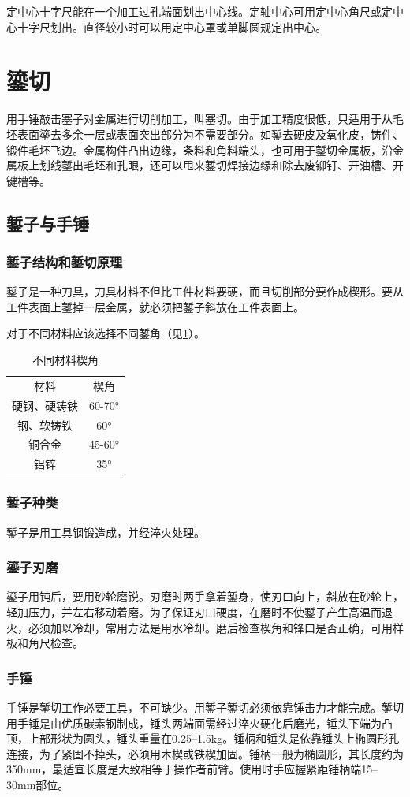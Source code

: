 \documentclass{ctexbook}
\begin{document}
定中心十字尺能在一个加工过孔端面划出中心线。定轴中心可用定中心角尺或定中心十字尺划出。直径较小时可以用定中心罩或单脚圆规定出中心。
\section{鎏切}
用手锤敲击塞子对金属进行切削加工，叫塞切。由于加工精度很低，只适用于从毛坯表面鎏去多余一层或表面突出部分为不需要部分。如錾去硬皮及氧化皮，铸件、锻件毛坯飞边。金属构件凸出边缘，条料和角料端头，也可用于錾切金属板，沿金属板上划线錾出毛坯和孔眼，还可以甩来錾切焊接边缘和除去废铆钉、开油槽、开键槽等。
\subsection{錾子与手锤}
\subsubsection{錾子结构和錾切原理}
錾子是一种刀具，刀具材料不但比工件材料要硬，而且切削部分要作成楔形。要从工件表面上錾掉一层金属，就必须把錾子斜放在工件表面上。

对于不同材料应该选择不同錾角（见\ref{tab:xiejiao}）。

\begin{table}[htbp]
	\centering
	\caption{不同材料楔角}
	\begin{tabular}{cc}
		材料    &  楔角 \\
		硬钢、硬铸铁 & 60-70° \\
		钢、软铸铁 & 60° \\
		铜合金   & 45-60° \\
		铝锌    & 35° \\
	\end{tabular}%
	\label{tab:xiejiao}%
\end{table}%
\subsubsection{錾子种类}
錾子是用工具钢锻造成，并经淬火处理。
\subsubsection{鎏子刃磨}
鎏子用钝后，要用砂轮磨锐。刃磨时两手拿着錾身，使刃口向上，斜放在砂轮上，轻加压力，并左右移动着磨。为了保证刃口硬度，在磨时不使錾子产生高温而退火，必须加以冷却，常用方法是用水冷却。磨后检查楔角和锋口是否正确，可用样板和角尺检查。
\subsubsection{手锤}
手锤是錾切工作必要工具，不可缺少。用錾子錾切必须依靠锤击力才能完成。錾切用手锤是由优质碳素钢制成，锤头两端面需经过淬火硬化后磨光，锤头下端为凸顶，上部形状为圆头，锤头重量在0.25--1.5kg。锤柄和锤头是依靠锤头上椭圆形孔连接，为了紧固不掉头，必须用木楔或铁楔加固。锤柄一般为椭圆形，其长度约为350mm，最适宜长度是大致相等于操作者前臂。使用时手应握紧距锤柄端15--30mm部位。
\end{document}
